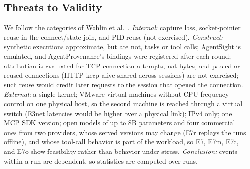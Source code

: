 \subsection{Threats to Validity}
We follow the categories of Wohlin et al.~\cite{wohlin2012experimentation}. \emph{Internal:} capture loss, socket-pointer reuse in the connect/state join, and PID reuse (not exercised). \emph{Construct:} synthetic executions approximate, but are not, tasks or tool calls; AgentSight is emulated, and AgentProvenance's bindings were registered after each round; attribution is evaluated for TCP connection attempts, not bytes, and pooled or reused connections (\eg HTTP keep-alive shared across sessions) are not exercised; such reuse would credit later requests to the session that opened the connection. \emph{External:} a single kernel; VMware virtual machines without CPU frequency control on one physical host, so the second machine is reached through a virtual switch (E3net latencies would be higher over a physical link); IPv4 only; one MCP SDK version; open models of up to 8B parameters and four commercial ones from two providers, whose served versions may change (E7r replays the runs offline), and whose tool-call behavior is part of the workload, so E7, E7m, E7c, and E7o show feasibility rather than behavior under stress. \emph{Conclusion:} events within a run are dependent, so statistics are computed over runs.
